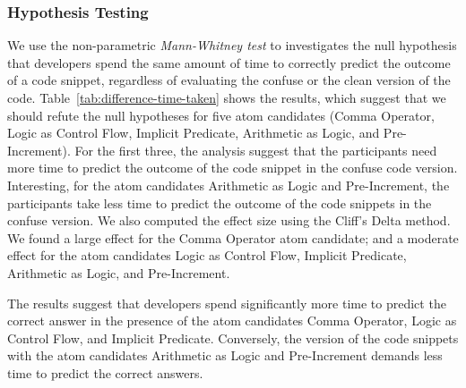 \subsubsection*{Hypothesis Testing}
We use the non-parametric \emph{Mann-Whitney test} to
investigates the null hypothesis that developers 
spend the same amount of time to correctly
predict the outcome of a code snippet, regardless
of evaluating the confuse or the clean version
of the code. Table~\ref{tab:difference-time-taken}
shows the results, which suggest that we
should refute the null hypotheses for
five atom candidates (Comma Operator, Logic
as Control Flow, Implicit Predicate, Arithmetic
as Logic, and Pre-Increment). For the first three,
the analysis suggest that the participants
need more time to predict the outcome of
the code snippet in the confuse code version. Interesting,
for the atom candidates Arithmetic as Logic and
Pre-Increment, the participants take less time
to predict the outcome of the code snippets in
the confuse version.
We also computed the effect size using the Cliff's Delta method.
We found a large effect for the Comma Operator atom
candidate; and a moderate effect for the atom candidates
Logic as Control Flow, Implicit Predicate, Arithmetic
as Logic, and Pre-Increment. 


\begin{mh}
  The results suggest that developers spend
  significantly more time to predict the
  correct answer in the presence of the
  atom candidates Comma Operator, Logic as
  Control Flow, and Implicit Predicate. Conversely,
  the version of the code snippets with the
  atom candidates Arithmetic as Logic and
  Pre-Increment demands less time to
  predict the correct answers. 
\end{mh}




